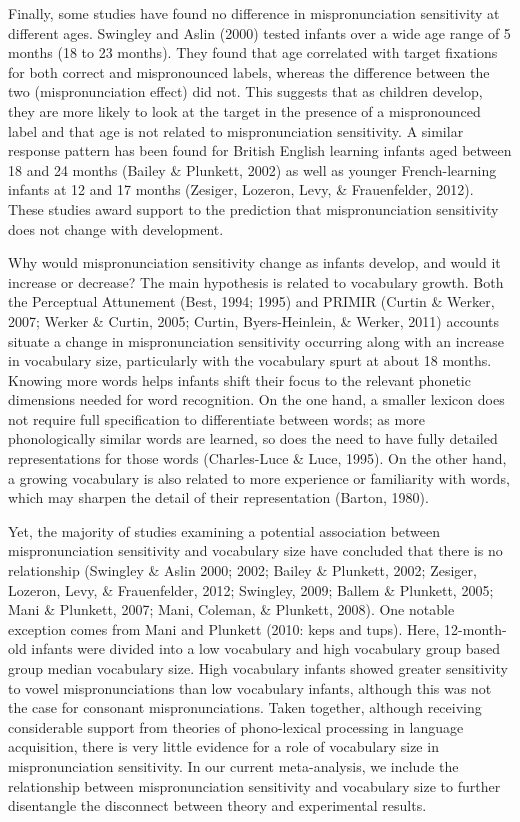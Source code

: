 \documentclass[man]{apa6}
\theoremstyle{definition}
\theoremstyle{definition}
\theoremstyle{definition}
\theoremstyle{remark}
\begin{document}
Finally, some studies have found no difference in mispronunciation
sensitivity at different ages. Swingley and Aslin (2000) tested infants
over a wide age range of 5 months (18 to 23 months). They found that age
correlated with target fixations for both correct and mispronounced
labels, whereas the difference between the two (mispronunciation effect)
did not. This suggests that as children develop, they are more likely to
look at the target in the presence of a mispronounced label and that age
is not related to mispronunciation sensitivity. A similar response
pattern has been found for British English learning infants aged between
18 and 24 months (Bailey \& Plunkett, 2002) as well as younger
French-learning infants at 12 and 17 months (Zesiger, Lozeron, Levy, \&
Frauenfelder, 2012). These studies award support to the prediction that
mispronunciation sensitivity does not change with development.

Why would mispronunciation sensitivity change as infants develop, and
would it increase or decrease? The main hypothesis is related to
vocabulary growth. Both the Perceptual Attunement (Best, 1994; 1995) and
PRIMIR (Curtin \& Werker, 2007; Werker \& Curtin, 2005; Curtin,
Byers-Heinlein, \& Werker, 2011) accounts situate a change in
mispronunciation sensitivity occurring along with an increase in
vocabulary size, particularly with the vocabulary spurt at about 18
months. Knowing more words helps infants shift their focus to the
relevant phonetic dimensions needed for word recognition. On the one
hand, a smaller lexicon does not require full specification to
differentiate between words; as more phonologically similar words are
learned, so does the need to have fully detailed representations for
those words (Charles-Luce \& Luce, 1995). On the other hand, a growing
vocabulary is also related to more experience or familiarity with words,
which may sharpen the detail of their representation (Barton, 1980).

Yet, the majority of studies examining a potential association between
mispronunciation sensitivity and vocabulary size have concluded that
there is no relationship (Swingley \& Aslin 2000; 2002; Bailey \&
Plunkett, 2002; Zesiger, Lozeron, Levy, \& Frauenfelder, 2012; Swingley,
2009; Ballem \& Plunkett, 2005; Mani \& Plunkett, 2007; Mani, Coleman,
\& Plunkett, 2008). One notable exception comes from Mani and Plunkett
(2010: keps and tups). Here, 12-month-old infants were divided into a
low vocabulary and high vocabulary group based group median vocabulary
size. High vocabulary infants showed greater sensitivity to vowel
mispronunciations than low vocabulary infants, although this was not the
case for consonant mispronunciations. Taken together, although receiving
considerable support from theories of phono-lexical processing in
language acquisition, there is very little evidence for a role of
vocabulary size in mispronunciation sensitivity. In our current
meta-analysis, we include the relationship between mispronunciation
sensitivity and vocabulary size to further disentangle the disconnect
between theory and experimental results.
\end{document}
